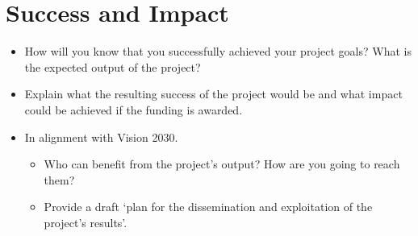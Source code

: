 \documentclass{article}
\begin{document}
\section{Success and Impact}
\begin{itemize}
	\item How will you know that you successfully achieved your project goals? What is the expected output of the project?
	\item Explain what the resulting success of the project would be and what impact could be achieved if the funding is awarded.
	\item In alignment with Vision 2030.
	      \begin{itemize}
		      \item Who can benefit from the project's output? How are you going to reach them?
		      \item Provide a draft ‘plan for the dissemination and exploitation of the project's results’.
	      \end{itemize}
\end{itemize}





\end{document}
